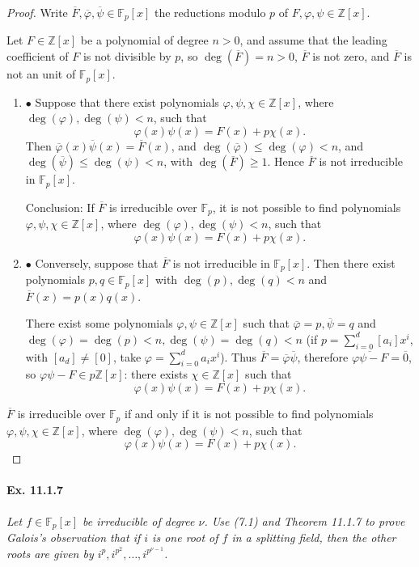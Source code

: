 \documentclass[11pt,a4paper]{article}
\newcommand{\be} {\begin{enumerate}}
\newcommand{\ee} {\end{enumerate}}
\newcommand{\Z}{\mathbb{Z}}
\newcommand{\F}{\mathbb{F}}
\begin{document}
\begin{proof}
Write $\overline{F},\overline{\varphi}, \overline{\psi} \in \F_p[x]$ the reductions modulo $p$ of $F,\varphi,\psi \in \Z[x]$. 

Let $F \in \Z[x]$ be a polynomial of degree $n>0$, and assume that the leading coefficient of $F$ is not divisible by $p$, so $\deg(\overline{F}) = n>0$, $\overline{F}$ is not zero, and 
$\overline{F}$ is not an unit of $\F_p[x]$.
\be
\item[$\bullet$] Suppose that there exist polynomials $\varphi,\psi,\chi \in \Z[x]$, where $\deg(\varphi),\deg(\psi) < n$, such that
$$\varphi(x) \psi(x) = F(x) + p \chi(x).$$
Then $\overline{\varphi}(x) \overline{\psi}(x) = \overline{F}(x)$, and $\deg(\overline{\varphi}) \leq \deg(\varphi) < n$, and $\deg(\overline{\psi}) \leq \deg(\psi) < n$, with $\deg(\overline{F})\geq 1$. Hence $\overline{F}$ is not irreducible in $\F_p[x]$. 

Conclusion: If $\overline{F}$ is irreducible over $\F_p$, it is not possible to find polynomials $\varphi,\psi,\chi \in \Z[x]$, where $\deg(\varphi),\deg(\psi) < n$, such that
$$\varphi(x) \psi(x) = F(x) + p \chi(x).$$

\item[$\bullet$]  Conversely, suppose that $\overline{F}$ is not irreducible in $\F_p[x]$. Then there exist polynomials $p,q \in \F_p[x]$ with $\deg(p),\deg(q)<n$ and $\overline{F}(x) = p(x)q(x)$.

There exist some polynomials $\varphi, \psi \in \Z[x]$ such that $\overline{\varphi} = p, \overline{\psi} = q$ and $\deg(\varphi) = \deg(p) < n, \deg(\psi) = \deg(q)<n$ (if $p = \sum_{i=0}^d [a_i] x^i$, with $[a_d] \ne [0]$, take $\varphi = \sum_{i=0}^d a_i x^i$). Thus $\overline{F} = \overline{\varphi} \overline{\psi} $, therefore $\overline{\varphi \psi-F} = \overline{0}$, so $ \varphi \psi -F \in p \Z[x]$: there exists $\chi \in \Z[x]$ such that
$$\varphi(x) \psi(x) = F(x) + p \chi(x).$$
\ee

$\overline{F}$ is irreducible over $\F_p$ if and only if it is not possible to find polynomials $\varphi,\psi,\chi \in \Z[x]$, where $\deg(\varphi),\deg(\psi) < n$, such that
$$\varphi(x) \psi(x) = F(x) + p \chi(x).$$
\end{proof}

\paragraph{Ex. 11.1.7}

{\it Let $f \in \F_p[x]$ be irreducible of degree $\nu$. Use (7.1) and Theorem 11.1.7 to prove Galois's observation that if $i$ is one root of $f$ in a splitting field, then the other roots are given by $i^p,i^{p^2},\ldots,i^{p^{\nu-1}}$.
}
\end{document}
